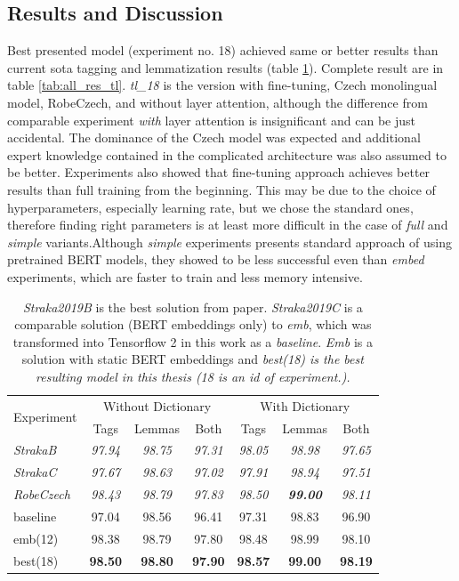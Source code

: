 \subsection{Results and Discussion}
Best presented model (experiment no. 18) achieved same or better results than current \acrlong{sota} tagging and lemmatization results (table \ref{tab:all_prew}). Complete result are in table \ref{tab:all_res_tl}. \textit{tl\_18} is the version with fine-tuning, Czech monolingual model, RobeCzech, and without layer attention, although the difference from comparable experiment \textit{with} layer attention is insignificant and can be just accidental. The dominance of the Czech model was expected and additional expert knowledge contained in the complicated architecture was also assumed to be better. Experiments also showed that fine-tuning approach achieves better results than full training from the beginning. This may be due to the choice of hyperparameters, especially learning rate, but  we chose the standard ones, therefore finding right parameters is at least more difficult in the case of \textit{full} and \textit{simple} variants.Although \textit{simple} experiments presents standard approach of using pretrained BERT models, they showed to be less successful even than \textit{embed} experiments, which are faster to train and less memory intensive. 

\begin{table}[!h]
\centering
  \begin{tabular}{|l||ccc||ccc|}
  \hline
\multirow{2}{*}{Experiment} & \multicolumn{3}{c||}{Without Dictionary}  &
      \multicolumn{3}{c|}{With Dictionary} \\ 
    & Tags & Lemmas & Both & Tags & Lemmas & Both \\ \hline \hline
    \textit{StrakaB} & \textit{97.94} & \textit{98.75} & \textit{97.31} & \textit{98.05} & \textit{98.98} & \textit{97.65 }\\ \hline
   \textit{ StrakaC} & \textit{97.67} & \textit{98.63} & \textit{97.02} & \textit{97.91 }& \textit{98.94} & \textit{97.51} \\ \hline
     \textit{RobeCzech} & \textit{98.43} & \textit{98.79}  & \textit{97.83}  & \textit{98.50} & \textit{\textbf{99.00}}  & \textit{98.11} \\ \hline \hline
      baseline & 97.04  & 98.56  & 96.41 &  97.31   & 98.83  & 96.90 \\ \hline 
    emb(12) & 98.38  &98.79  & 97.80 & 98.48  & 98.99 & 98.10 \\ \hline
    best(18) & \textbf{98.50}  & \textbf{98.80} &\textbf{ 97.90}  & \textbf{98.57}  & \textbf{99.00}  & \textbf{98.19}  \\ \hline  
  \end{tabular}
  \caption{%
  \textit{Straka2019B} is the best solution from \citep{Straka2019} paper. \textit{Straka2019C} is a comparable solution  (BERT embeddings only) to \textit{emb}, which was transformed into Tensorflow 2 in this work as a \textit{baseline}. \textit{Emb} is a solution with static BERT embeddings and \textit{best(18) is the best resulting model in this thesis (18 is an id of experiment.). }}
\label{tab:all_prew} 
\end{table}

